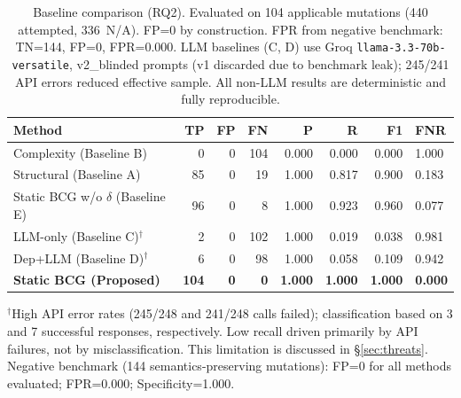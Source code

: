 \begin{table}[t]
\small
\centering
\caption{Baseline comparison (RQ2). Evaluated on 104 applicable mutations (440 attempted, 336~N/A). FP=0 by construction. FPR from negative benchmark: TN=144, FP=0, FPR=0.000. LLM baselines (C, D) use Groq \texttt{llama-3.3-70b-versatile}, v2\_blinded prompts (v1 discarded due to benchmark leak); 245/241 API errors reduced effective sample. All non-LLM results are deterministic and fully reproducible.}
\label{table:baselines}
\begin{tabular}{lrrrrrrl}
\toprule
Method & TP & FP & FN & P & R & F1 & FNR \\
\midrule
Complexity (Baseline B)       & 0  & 0 & 104 & 0.000 & 0.000 & 0.000 & 1.000 \\
Structural (Baseline A)       & 85 & 0 &  19 & 1.000 & 0.817 & 0.900 & 0.183 \\
Static BCG w/o $\delta$ (Baseline E) & 96 & 0 & 8 & 1.000 & 0.923 & 0.960 & 0.077 \\
LLM-only (Baseline C)$^\dagger$ & 2  & 0 & 102 & 1.000 & 0.019 & 0.038 & 0.981 \\
Dep+LLM (Baseline D)$^\dagger$ & 6  & 0 &  98 & 1.000 & 0.058 & 0.109 & 0.942 \\
\midrule
\textbf{Static BCG (Proposed)} & \textbf{104} & \textbf{0} & \textbf{0} & \textbf{1.000} & \textbf{1.000} & \textbf{1.000} & \textbf{0.000} \\
\bottomrule
\end{tabular}
\vspace{0.3em}
{\small $^\dagger$High API error rates (245/248 and 241/248 calls failed); classification based on 3 and 7 successful responses, respectively. Low recall driven primarily by API failures, not by misclassification. This limitation is discussed in \S\ref{sec:threats}.}
\vspace{0.3em}
{\small Negative benchmark (144 semantics-preserving mutations): FP=0 for all methods evaluated; FPR=0.000; Specificity=1.000.}
\end{table}
